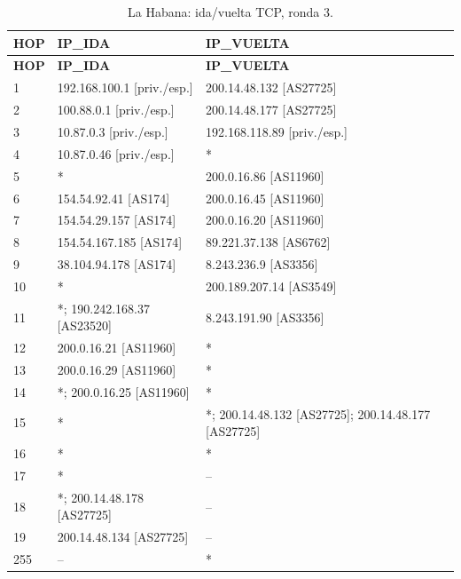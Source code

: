 \begin{longtable}{p{0.95cm}p{7.075cm}p{7.075cm}}
\caption{La Habana: ida/vuelta TCP, ronda 3.}\label{anexo:vuelta:200.14.48.134:TCP:3} \\
\toprule
\textbf{HOP} & \textbf{IP\_\allowbreak{}IDA} & \textbf{IP\_\allowbreak{}VUELTA} \\ \midrule
\endfirsthead
\toprule
\textbf{HOP} & \textbf{IP\_\allowbreak{}IDA} & \textbf{IP\_\allowbreak{}VUELTA} \\ \midrule
\endhead
1 & 192.168.100.1 [priv./esp.] & 200.14.48.132 [AS27725] \\
2 & 100.88.0.1 [priv./esp.] & 200.14.48.177 [AS27725] \\
3 & 10.87.0.3 [priv./esp.] & 192.168.118.89 [priv./esp.] \\
4 & 10.87.0.46 [priv./esp.] & * \\
5 & * & 200.0.16.86 [AS11960] \\
6 & 154.54.92.41 [AS174] & 200.0.16.45 [AS11960] \\
7 & 154.54.29.157 [AS174] & 200.0.16.20 [AS11960] \\
8 & 154.54.167.185 [AS174] & 89.221.37.138 [AS6762] \\
9 & 38.104.94.178 [AS174] & 8.243.236.9 [AS3356] \\
10 & * & 200.189.207.14 [AS3549] \\
11 & *; 190.242.168.37 [AS23520] & 8.243.191.90 [AS3356] \\
12 & 200.0.16.21 [AS11960] & * \\
13 & 200.0.16.29 [AS11960] & * \\
14 & *; 200.0.16.25 [AS11960] & * \\
15 & * & *; 200.14.48.132 [AS27725]; 200.14.48.177 [AS27725] \\
16 & * & * \\
17 & * & -- \\
18 & *; 200.14.48.178 [AS27725] & -- \\
19 & 200.14.48.134 [AS27725] & -- \\
255 & -- & * \\
\bottomrule
\end{longtable}
\endgroup
\begingroup
\fontsize{8}{10}\selectfont
